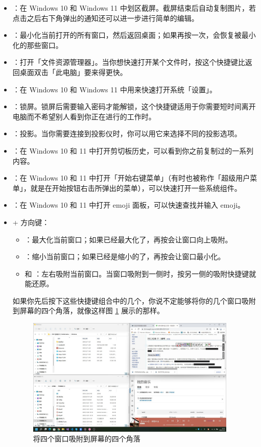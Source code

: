 \begin{itemize}
  \item {}：在 Windows 10 和 Windows 11 中划区截屏。截屏结束后自动复制图片，若点击之后右下角弹出的通知还可以进一步进行简单的编辑。
  \item {}：最小化当前打开的所有窗口，然后返回桌面；如果再按一次，会恢复被最小化的那些窗口。
  \item {}：打开「文件资源管理器」。当你想快速打开某个文件时，按这个快捷键比返回桌面双击「此电脑」要来得更快。
  \item {}：在 Windows 10 和 Windows 11 中用来快速打开系统「设置」。
  \item {}：锁屏。锁屏后需要输入密码才能解锁，这个快捷键适用于你需要短时间离开电脑而不希望别人看到你正在进行的工作时。
  \item {}：投影。当你需要连接到投影仪时，你可以用它来选择不同的投影选项。
  \item {}：在 Windows 10 和 11 中打开剪切板历史，可以看到你之前复制过的一系列内容。
  \item {}：在 Windows 10 和 11 中打开「开始右键菜单」（有时也被称作「超级用户菜单」，就是在开始按钮右击所弹出的菜单），可以快速打开一些系统组件。
  \item {}：在 Windows 10 和 11 中打开 emoji 面板，可以快速查找并输入 emoji。
  \item {} + 方向键：
  \begin{itemize}
    \item {}：最大化当前窗口；如果已经最大化了，再按会让窗口向上吸附。
    \item {}：缩小当前窗口；如果已经是缩小的了，再按会让窗口最小化。
    \item {} 和 ：左右吸附当前窗口。当窗口吸附到一侧时，按另一侧的吸附快捷键就能还原。
  \end{itemize}

  如果你先后按下这些快捷键组合中的几个，你说不定能够将你的几个窗口吸附到屏幕的四个角落，就像这样图 \ref{Four_windows} 展示的那样。

  \begin{figure}[htb!]
    \centering
    \includegraphics[width=10cm]{assets/Four_windows.jpg}
    \caption{将四个窗口吸附到屏幕的四个角落}
    \label{Four_windows}
  \end{figure}


\end{itemize}
